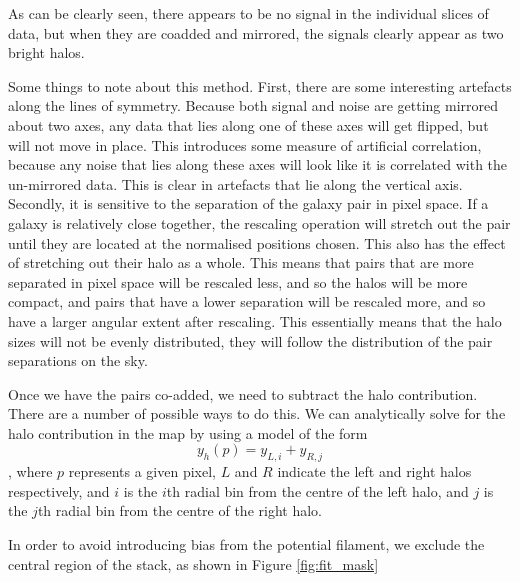 As can be clearly seen, there appears to be no signal in the individual slices of data, but when they are coadded and mirrored, the signals clearly appear as two bright halos. 

Some things to note about this method. First, there are some interesting artefacts along the lines of symmetry. Because both signal and noise are getting mirrored about two axes, any data that lies along one of these axes will get flipped, but will not move in place. This introduces some measure of artificial correlation, because any noise that lies along these axes will look like it is correlated with the un-mirrored data. This is clear in artefacts that lie along the vertical axis. 
Secondly, it is sensitive to the separation of the galaxy pair in pixel space. If a galaxy is relatively close together, the rescaling operation will stretch out the pair until they are located at the normalised positions chosen. This also has the effect of stretching out their halo as a whole. This means that pairs that are more separated in pixel space will be rescaled less, and so the halos will be more compact, and pairs that have a lower separation will be rescaled more, and so have a larger angular extent after rescaling. This essentially means that the halo sizes will not be evenly distributed, they will follow the distribution of the pair separations on the sky.  

\par Once we have the pairs co-added, we need to subtract the halo contribution. There are a number of possible ways to do this. We can analytically solve for the halo contribution in the map by using a model of the form 
\begin{equation}
y_h(p) = y_{L,i} + y_{R,j} 
\end{equation}
, where $p$ represents a given pixel, $L$ and $R$ indicate the left and right halos respectively, and $i$ is the $i$th radial bin from the centre of the left halo, and $j$ is the $j$th radial bin from the centre of the right halo. 

\par In order to avoid introducing bias from the potential filament, we exclude the central region of the stack, as shown in Figure \ref{fig:fit_mask}

